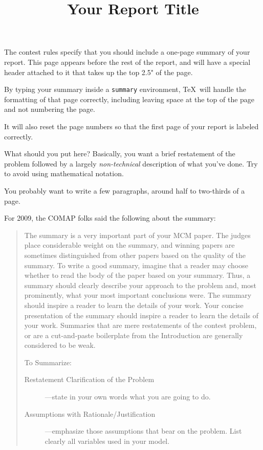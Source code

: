\documentclass{icmmcm}
\title{Your Report Title}
\begin{document}

\begin{summary}
  The contest rules specify that you should include a one-page summary
  of your report.  This page appears before the rest of the report,
  and will have a special header attached to it that takes up the top
  2.5" of the page.

  By typing your summary inside a \texttt{summary} environment, \TeX\ will
  handle the formatting of that page correctly, including leaving
  space at the top of the page and not numbering the page.
  
  It will also reset the page numbers so that the first page of your
  report is labeled correctly.
  
  What should you put here?  Basically, you want a brief restatement
  of the problem followed by a largely \emph{non-technical}
  description of what you've done.  Try to avoid using mathematical
  notation.
  
  You probably want to write a few paragraphs, around half to
  two-thirds of a page.

  For 2009, the COMAP folks said the following about the summary:
  \begin{quotation}
    The summary is a very important part of your MCM paper. The
    judges place considerable weight on the summary, and winning
    papers are sometimes distinguished from other papers based on
    the quality of the summary. To write a good summary, imagine
    that a reader may choose whether to read the body of the paper
    based on your summary. Thus, a summary should clearly describe
    your approach to the problem and, most prominently, what your
    most important conclusions were. The summary should inspire a
    reader to learn the details of your work.  Your concise
    presentation of the summary should inspire a reader to learn
    the details of your work. Summaries that are mere restatements
    of the contest problem, or are a cut-and-paste boilerplate
    from the Introduction are generally considered to be
    weak.

To Summarize:
\begin{description}
\item[Restatement Clarification of the Problem]---state in your own
  words what you are going to do.

\item[Assumptions with Rationale/Justification]---emphasize those
  assumptions that bear on the problem. List clearly all variables
  used in your model.


\end{description}
\end{quotation}
\end{summary}
\end{document}

